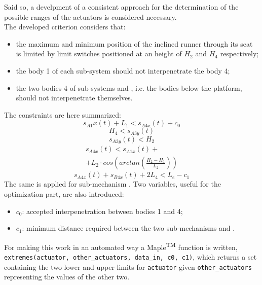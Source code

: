 \documentclass[10.5pt, twocolumn]{article}
\newcommand*\circled[1]{\tikz[baseline=(char.base)]{
	\node[shape=circle,draw,inner sep=2pt] (char) {#1};}}
\begin{document}
Said so, a develpment of a consistent approach for the determination of the possible ranges of the actuators is considered necessary.\\
The developed criterion considers that:
\begin{itemize}
  \item the maximum and minimum position of the inclined runner through its seat is limited by limit switches positioned at an height of \( H_2 \) and \( H_4 \) respectively;
  \item the body 1 of each sub-system should not interpenetrate the body 4;
  \item the two bodies 4 of sub-systems \circled{A} and \circled{B}, i.e. the bodies below the platform, should not interpenetrate themselves.
\end{itemize}

The constraints are here summarized:
\begin{equation}
    s_{A1}x(t)+L_1 < s_{A4x}(t)+c_0
\end{equation}
\begin{equation}
    H_4 < s_{A3y}(t)
\end{equation}
\begin{equation}
   s_{A3y}(t) < H_2
\end{equation}
\begin{multline}
    s_{A4x}(t) < s_{A1x}(t)+\\
    +L_2 \cdot cos(arctan(\frac{H_2-H_1}{L_2}))
\end{multline}
\begin{equation}
   s_{A4x}(t)+s_{B4x}(t)+2 L_4 < L_e-c_1
\end{equation}
The same is applied for sub-mechanism \circled{B}.
Two variables, useful for the optimization part, are also introduced:
\begin{itemize}
  \item \( c_0 \): accepted interpenetration between bodies 1 and 4;
  \item \( c_1 \): minimum distance required between the two sub-mechanisms \circled{A} and \circled{B}.
\end{itemize}

For making this work in an automated way a Maple\textsuperscript{TM} function is written, \texttt{extremes(actuator, other\_actuators, data\_in, c0, c1)}, which returns a set containing the two lower and upper limits for \texttt{actuator} given \texttt{other\_actuators} representing the values of the other two.
\end{document}
